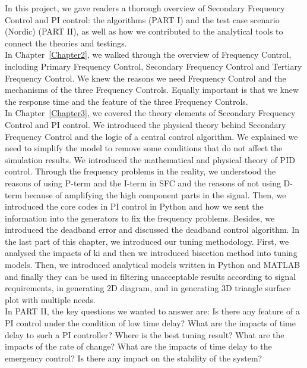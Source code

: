 In this project, we gave readers a thorough overview of Secondary Frequency Control and PI control: the algorithms (PART I) and the test case scenario (Nordic) (PART II), as well as how we contributed to the analytical tools to connect the theories and testings. \\

In Chapter~\ref{Chapter2}, we walked through the overview of Frequency Control, including Primary Frequency Control, Secondary Frequency Control and Tertiary Frequency Control. We knew the reasons we need Frequency Control and the mechanisms of the three Frequency Controls. Equally important is that we knew the response time and the feature of the three Frequency Controls. \\

In Chapter~\ref{Chapter3}, we covered the theory elements of Secondary Frequency Control and PI control. We introduced the physical theory behind Secondary Frequency Control and the logic of a central control algorithm. We explained we need to simplify the model to remove some conditions that do not affect the simulation results. We introduced the mathematical and physical theory of PID control. Through the frequency problems in the reality, we understood the reasons of using P-term and the I-term in SFC and the reasons of not using D-term because of amplifying the high component parts in the signal. Then, we introduced the core codes in PI control in Python and how we sent the information into the generators to fix the frequency problems. Besides, we introduced the deadband error and discussed the deadband control algorithm. In the last part of this chapter, we introduced our tuning methodology. First, we analysed the impacts of ki and then we introduced bisection method into tuning models. Then, we introduced analytical models written in Python and MATLAB and finally they can be used in filtering unacceptable results according to signal requirements, in generating 2D diagram, and in generating 3D triangle surface plot with multiple needs. \\

In PART II, the key questions we wanted to answer are: Is there any feature of a PI control under the condition of low time delay? What are the impacts of time delay to such a PI controller? Where is the best tuning result? What are the impacts of the rate of change? What are the impacts of time delay to the emergency control? Is there any impact on the stability of the system?\\

